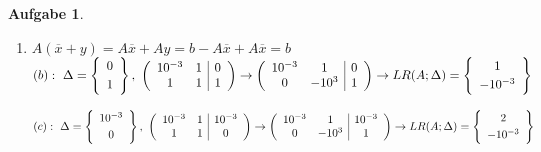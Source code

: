 \documentclass[11pt]{article}
\theoremstyle{break}
\newtheorem{task}{Aufgabe}
\begin{document}
\begin{task}
\begin{enumerate}[label={(\alph*)}]
        \item $A(\overline{x} + y) = A\overline{x} + Ay = b - A\overline{x} + A\overline{x} = b$\\
        $(b):\ \Delta = \left\{\begin{array}{c}
            0\vspace{1mm}\\
            1
        \end{array}\right\},\ \left(\begin{array}{cc|c}
            10^{-3} & 1 & 0\\
            1 & 1 & 1
        \end{array}\right)
        \rightarrow \left(\begin{array}{cc|c}
            10^{-3} & 1 & 0\\
            0 & -10^3 & 1
        \end{array}\right)
        \rightarrow LR(A;\Delta) = \left\{\begin{array}{c}
            1\vspace{1mm}\\
            -10^{-3}
        \end{array}\right\}\\$
        
        $(c):\ \Delta = \left\{\begin{array}{c}
            10^{-3}\vspace{1mm}\\
            0
        \end{array}\right\},\ \left(\begin{array}{cc|c}
            10^{-3} & 1 & 10^{-3}\\
            1 & 1 & 0
        \end{array}\right)
        \rightarrow \left(\begin{array}{cc|c}
            10^{-3} & 1 & 10^{-3}\\
            0 & -10^3 & 1
        \end{array}\right)
        \rightarrow LR(A;\Delta) = \left\{\begin{array}{c}
            2\vspace{1mm}\\
            -10^{-3}
        \end{array}\right\}$
    \end{enumerate}
\end{task}
\end{document}
